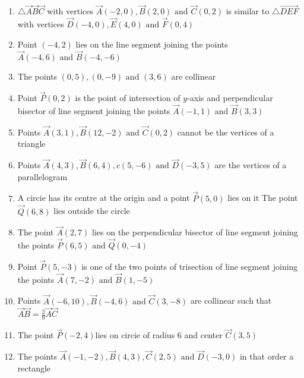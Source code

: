 \begin{enumerate}[label=\thesection.\arabic*,ref=\thesection.\theenumi]

	\item $\triangle\vec{A}\vec{B}\vec{C}$ with vertices $\vec{A}(-2,0), \vec{B}(2,0) \text{ and }\vec{C}(0,2)$ is similar to $\triangle \vec{DEF}$  with vertices $\vec {D}(-4,0),\vec{E}(4,0)  \text{ and } \vec{F}(0,4)$  
	\item Point $ (-4,2)$ lies on the line segment joining the points $ \vec{A}(-4,6) \text{ and } \vec{B}(-4,-6)$
 \item The points $(0,5),(0,-9)\text{ and }(3,6)$ are collinear
\item  Point $\vec{P}(0,2)$ is the point of intersection of $y$-axis and perpendicular bisector of line segment joining the points $\vec{A}(-1,1) \text{ and } \vec{B}(3,3)$
\item Points $\vec{A}(3,1), \vec{B}(12,-2) \text{ and } \vec {C}(0,2)$ cannot be the vertices of a triangle
\item Points $\vec{A}(4,3), \vec{B}(6,4),{c}(5,-6) \text{ and } \vec{D}(-3,5)$ are the vertices of a parallelogram  
\item A circie has its centre at the origin and a point $\vec{P}(5,0)$ lies on it The point $\vec{Q}(6,8)$ lies outside the circle
\item The point $\vec{A}(2,7)$ lies on the perpendicular bisector of line segment joining the points $\vec{P}(6,5)\text{ and } \vec{Q}(0,-4)$
\item Point $\vec{P}(5,-3)$ is one of the two points of trisection of line segment joining the points $\vec{A}(7,-2)\text{ and }\vec{B}(1,-5)$
\item Points $\vec{A}(-6,10),\vec{B}(-4,6) \text{ and } \vec{C}(3,-8)$ are collinear such that $\vec{A}\vec{B}=  \frac{2}{9}\vec{A}\vec{C}$
 \item The point $\vec{P}(-2,4)$lies on circie of radius 6 and center $\vec{C}(3,5)$
\item The points $\vec{A}(-1,-2),\vec{B}(4,3),\vec{C}(2,5) \text{ and } \vec{D}(-3,0)$ in that order a rectangle
	\end{enumerate}

